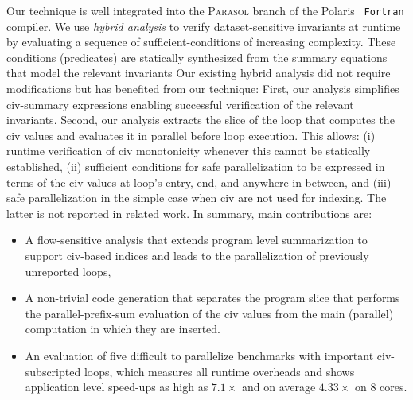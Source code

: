 \documentclass[10pt,nocopyrightspace]{sigplanconf}
\begin{document}
Our technique is well integrated 
into the \textsc{Parasol} branch of the Polaris~\cite{Blume94automaticdetection} 
{\tt Fortran} compiler. We  use {\em hybrid analysis} to
verify dataset-sensitive invariants %
at runtime by evaluating a sequence of sufficient-conditions 
 of increasing complexity.
These conditions (predicates) are statically synthesized from the summary 
equations that model the relevant invariants 
%
Our existing hybrid analysis did not require modifications
but has benefited from our technique: 
%
First, our analysis simplifies {\sc civ}-summary expressions
enabling successful verification of the relevant invariants.
Second, our analysis extracts the slice of the loop that computes
the {\sc civ} values and evaluates it in parallel before loop
execution. This allows: 
  (i) runtime verification of {\sc civ} monotonicity whenever 
          this cannot be statically established,  
 (ii) sufficient conditions for safe parallelization to 
          be expressed in terms of the {\sc civ} values at loop's 
          entry, end, and anywhere in between, and 
(iii) safe parallelization in the simple case when
        {\sc civ} are not used for indexing.
The latter is not reported in related work.
%
%
In summary, main contributions are:
\begin{itemize}
    \item A flow-sensitive analysis that extends 
            program level summarization to support {\sc civ}-based 
            indices and leads to the parallelization of
            previously unreported loops, 

    \item A non-trivial code generation that separates the 
            program slice that performs the parallel-prefix-sum
            evaluation of the {\sc civ} values 
            from the main (parallel) computation in which 
            they are inserted.
            
    \item An evaluation of five difficult to parallelize benchmarks 
            with important {\sc civ}-subscripted loops, which measures 
            all runtime overheads and shows application level speed-ups 
            as high as $7.1\times$ and on average $4.33\times$ on $8$ cores.
%
\end  {itemize}
\end{document}
